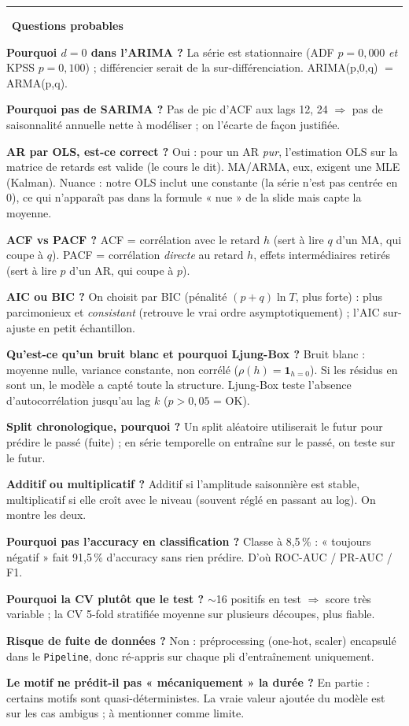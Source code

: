 \documentclass[11pt,a4paper]{article}
\newcommand{\code}[1]{\texttt{#1}}
\newenvironment{qa}{\par\medskip\noindent\textcolor{gray!55!black}{\rule[-1pt]{3pt}{12pt}}\
  \textbf{\textcolor{gray!55!black}{Questions probables}}\par\nopagebreak\smallskip\noindent\ignorespaces}{\par\medskip}
\begin{document}
\begin{qa}
\textbf{Pourquoi $d=0$ dans l'ARIMA ?} La série est stationnaire (ADF $p=0{,}000$ \emph{et} KPSS
$p=0{,}100$) ; différencier serait de la sur-différenciation. ARIMA(p,0,q) $=$ ARMA(p,q).

\textbf{Pourquoi pas de SARIMA ?} Pas de pic d'ACF aux lags 12, 24 $\Rightarrow$ pas de
saisonnalité annuelle nette à modéliser ; on l'écarte de façon justifiée.

\textbf{AR par OLS, est-ce correct ?} Oui : pour un AR \emph{pur}, l'estimation OLS sur la matrice
de retards est valide (le cours le dit). MA/ARMA, eux, exigent une MLE (Kalman). Nuance : notre OLS
inclut une constante (la série n'est pas centrée en 0), ce qui n'apparaît pas dans la formule
« nue » de la slide mais capte la moyenne.

\textbf{ACF vs PACF ?} ACF = corrélation avec le retard $h$ (sert à lire $q$ d'un MA, qui coupe à
$q$). PACF = corrélation \emph{directe} au retard $h$, effets intermédiaires retirés (sert à lire
$p$ d'un AR, qui coupe à $p$).

\textbf{AIC ou BIC ?} On choisit par BIC (pénalité $(p+q)\ln T$, plus forte) : plus parcimonieux et
\emph{consistant} (retrouve le vrai ordre asymptotiquement) ; l'AIC sur-ajuste en petit échantillon.

\textbf{Qu'est-ce qu'un bruit blanc et pourquoi Ljung-Box ?} Bruit blanc : moyenne nulle, variance
constante, non corrélé ($\rho(h)=\mathbf{1}_{h=0}$). Si les résidus en sont un, le modèle a capté
toute la structure. Ljung-Box teste l'absence d'autocorrélation jusqu'au lag $k$ ($p>0{,}05$ = OK).

\textbf{Split chronologique, pourquoi ?} Un split aléatoire utiliserait le futur pour prédire le
passé (fuite) ; en série temporelle on entraîne sur le passé, on teste sur le futur.

\textbf{Additif ou multiplicatif ?} Additif si l'amplitude saisonnière est stable, multiplicatif si
elle croît avec le niveau (souvent réglé en passant au log). On montre les deux.

\textbf{Pourquoi pas l'accuracy en classification ?} Classe à 8{,}5\,\% : « toujours négatif » fait
91{,}5\,\% d'accuracy sans rien prédire. D'où ROC-AUC / PR-AUC / F1.

\textbf{Pourquoi la CV plutôt que le test ?} $\sim$16 positifs en test $\Rightarrow$ score très
variable ; la CV 5-fold stratifiée moyenne sur plusieurs découpes, plus fiable.

\textbf{Risque de fuite de données ?} Non : préprocessing (one-hot, scaler) encapsulé dans le
\code{Pipeline}, donc ré-appris sur chaque pli d'entraînement uniquement.

\textbf{Le motif ne prédit-il pas « mécaniquement » la durée ?} En partie : certains motifs sont
quasi-déterministes. La vraie valeur ajoutée du modèle est sur les cas ambigus ; à mentionner comme
limite.
\end{qa}
\end{document}
